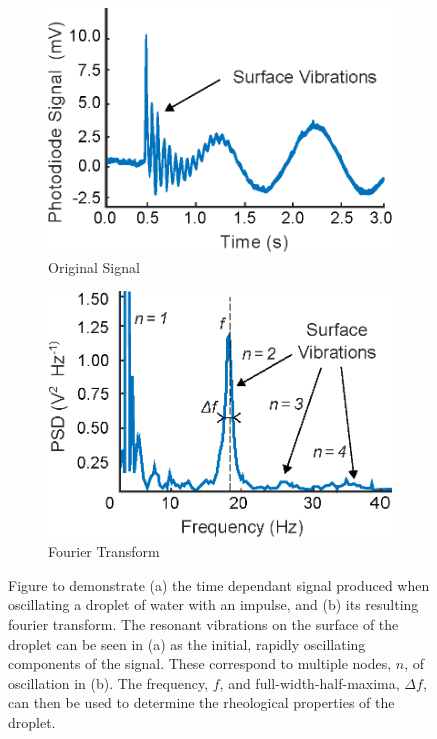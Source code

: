 \documentclass{physics_article_B}
\begin{document}
        \begin{figure}[H]
            \centering
                \begin{subfigure}[b]{0.48\textwidth}\hspace*{-1cm}\includegraphics[width=\textwidth]{Figures/TempertonSignal.eps}
                    \caption{Original Signal}
                    \label{fig:temperton:signal}
                \end{subfigure}\hspace{3pt}
                \begin{subfigure}[b]{0.48\textwidth}\hspace*{-0.5cm}\includegraphics[width=\textwidth]{Figures/TempertonSignalPD.eps}
                    \caption{Fourier Transform}
                    \label{fig:temperton:PD}
                \end{subfigure}
            \caption{Figure to demonstrate (a) the time dependant signal produced when oscillating a droplet of water with an impulse, and (b) its resulting fourier transform. The resonant vibrations on the surface of the droplet can be seen in (a) as the initial, rapidly oscillating components of the signal. These correspond to multiple nodes, $n$, of oscillation in (b). The frequency, $f$, and full-width-half-maxima, $\Delta f$, can then be used to determine the rheological properties of the droplet. }\label{fig:temperton}
        \end{figure}
\end{document}
